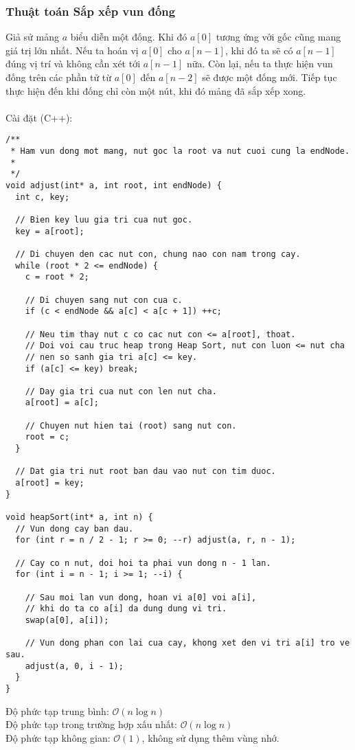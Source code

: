 \documentclass[]{article}
\begin{document}
\subsubsection{Thuật toán Sắp xếp vun đống}
Giả sử mảng $a$ biểu diễn một đống. Khi đó $a[0]$ tương ứng với gốc cũng mang giá trị lớn nhất. Nếu ta hoán vị $a[0]$ cho $a[n - 1]$, khi đó ta sẽ có $a[n - 1]$ đúng vị trí và không cần xét tới $a[n - 1]$ nữa. Còn lại, nếu ta thực hiện vun đống trên các phần tử từ $a[0]$ đến $a[n - 2]$ sẽ được một đống mới. Tiếp tục thực hiện đến khi đống chỉ còn một nút, khi đó mảng đã sắp xếp xong.
\\\\
Cài đặt (C++):
\begin{lstlisting}
/**
 * Ham vun dong mot mang, nut goc la root va nut cuoi cung la endNode.
 *
 */
void adjust(int* a, int root, int endNode) {
  int c, key;

  // Bien key luu gia tri cua nut goc.
  key = a[root];

  // Di chuyen den cac nut con, chung nao con nam trong cay.
  while (root * 2 <= endNode) {
    c = root * 2;

    // Di chuyen sang nut con cua c.
    if (c < endNode && a[c] < a[c + 1]) ++c;

    // Neu tim thay nut c co cac nut con <= a[root], thoat.
    // Doi voi cau truc heap trong Heap Sort, nut con luon <= nut cha
    // nen so sanh gia tri a[c] <= key.
    if (a[c] <= key) break;

    // Day gia tri cua nut con len nut cha.
    a[root] = a[c];

    // Chuyen nut hien tai (root) sang nut con.
    root = c;
  }

  // Dat gia tri nut root ban dau vao nut con tim duoc.
  a[root] = key;
}

void heapSort(int* a, int n) {
  // Vun dong cay ban dau.
  for (int r = n / 2 - 1; r >= 0; --r) adjust(a, r, n - 1);

  // Cay co n nut, doi hoi ta phai vun dong n - 1 lan.
  for (int i = n - 1; i >= 1; --i) {

    // Sau moi lan vun dong, hoan vi a[0] voi a[i],
    // khi do ta co a[i] da dung dung vi tri.
    swap(a[0], a[i]);

    // Vun dong phan con lai cua cay, khong xet den vi tri a[i] tro ve sau.
    adjust(a, 0, i - 1);
  }
}
\end{lstlisting}
Độ phức tạp trung bình: $\mathcal{O}(n \log n)$
\\
Độ phức tạp trong trường hợp xấu nhất: $\mathcal{O}(n \log n)$
\\
Độ phức tạp không gian: $\mathcal{O}(1)$, không sử dụng thêm vùng nhớ.
\end{document}
